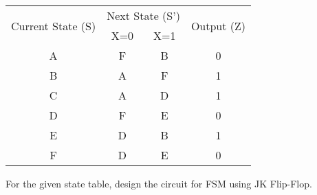 \documentclass[12pt, letterpaper]{article}
\begin{document}
\begin{center}
    \begin{tabular}{|c|cc|c|}
        \hline
        \multirow{2}{*}{Current State (S)} & \multicolumn{2}{c|}{Next State (S')} & \multirow{2}{*}{Output (Z)}     \\ \cline{2-3}
                                           & \multicolumn{1}{c|}{X=0}             & X=1                         &   \\ \hline
        A                                  & \multicolumn{1}{c|}{F  }             & B                           & 0 \\ \hline
        B                                  & \multicolumn{1}{c|}{A  }             & F                           & 1 \\ \hline
        C                                  & \multicolumn{1}{c|}{A  }             & D                           & 1 \\ \hline
        D                                  & \multicolumn{1}{c|}{F  }             & E                           & 0 \\ \hline
        E                                  & \multicolumn{1}{c|}{D  }             & B                           & 1 \\ \hline
        F                                  & \multicolumn{1}{c|}{D  }             & E                           & 0 \\ \hline
    \end{tabular}
\end{center}

For the given state table, design the circuit for FSM using JK Flip-Flop.
\end{document}
